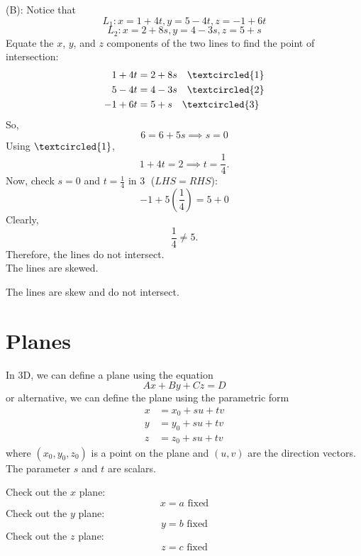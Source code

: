 \documentclass{article}
\begin{document}
\begin{examplebox}
\begin{solutionbox}
(B):
Notice that
\[
    L_1: x = 1 + 4t, y = 5 - 4t, z = -1 + 6t
\]
\[
    L_2: x = 2 + 8s, y = 4 - 3s, z = 5 + s
\]
Equate the \( x \), \( y \), and \( z \) components of the two lines to find the point of intersection:
\[
    \begin{aligned}
        1 + 4t &= 2 + 8s \quad \textcircled{1} \\
        5 - 4t &= 4 - 3s \quad \textcircled{2} \\
        -1 + 6t &= 5 + s \quad \textcircled{3}
    \end{aligned}
\]
So,
\[
    6 = 6 + 5s \implies s = 0
\]
Using \( \textcircled{1} \),
\[
    1 + 4t = 2 \implies t = \frac{1}{4}.
\]
Now, check \( s = 0 \) and \( t = \frac{1}{4} \) in \textcircled{3} (\( LHS = RHS \)):
\[
    -1 + 5\left(\frac{1}{4}\right) = 5 + 0
\]
Clearly,
\[
    \frac{1}{4} \neq 5.
\]
Therefore, the lines do not intersect. \\
The lines are skewed.
\begin{answerbox}
The lines are skew and do not intersect.
\end{answerbox}

\end{solutionbox}

\end{examplebox}

\section*{Planes}
\begin{definitionbox}
In 3D, we can define a plane using the equation
\[
    Ax + By + Cz = D
\]
or alternative, we can define the plane using the parametric form
\[
    \begin{aligned}
        x &= x_0 + su + tv \\
        y &= y_0 + su + tv \\
        z &= z_0 + su + tv
    \end{aligned}
\]
where \( (x_0, y_0, z_0) \) is a point on the plane and \( (u, v) \) are the direction vectors. The parameter \( s \) and \( t \) are scalars.
\end{definitionbox}

Check out the \( x \) plane:
\[
    x = a \text{ fixed}
\]
Check out the \( y \) plane:
\[
    y = b \text{ fixed}
\]
Check out the \( z \) plane:
\[
    z = c \text{ fixed}
\]
\end{document}
